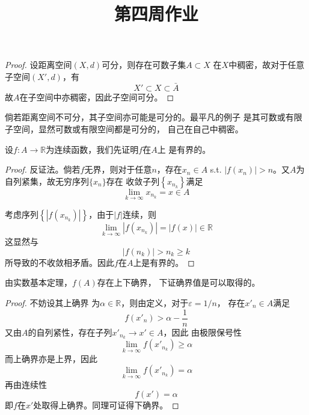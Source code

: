 \documentclass[cn]{homework}
\title{第四周作业}
\begin{document}
    \maketitle

    \problem
    \begin{proof}
        设距离空间$(X,d)$可分，则存在可数子集$A\subset X$
        在$X$中稠密，故对于任意子空间$(X',d)$，有
        \[X'\subset X\subset\bar A\]
        故$A$在子空间中亦稠密，因此子空间可分。
    \end{proof}

    倘若距离空间不可分，其子空间亦可能是可分的。最平凡的例子
    是其可数或有限子空间，显然可数或有限空间都是可分的，
    自己在自己中稠密。

    \problem
    设$f:A\to\mathbb R$为连续函数，我们先证明$f$在$A$上
    是有界的。
    \begin{proof}
        反证法。倘若$f$无界，则对于任意$n$，存在$x_n\in A$ s.t.
        $|f(x_n)|>n$。又$A$为自列紧集，故无穷序列$\{x_n\}$存在
        收敛子列$\left\{x_{n_k}\right\}$满足
        \[\lim_{k\to\infty}x_{n_k}=x\in A\]

        考虑序列$\left\{|f(x_{n_k})|\right\}$，由于$|f|$连续，则
        \[\lim_{k\to\infty}|f(x_{n_k})|=|f(x)|\in\mathbb R\]
        这显然与
        \[|f(n_k)|>n_k\geq k\]
        所导致的不收敛相矛盾。因此$f$在$A$上是有界的。
    \end{proof}

    由实数基本定理，$f(A)$存在上下确界，
    下证确界值是可以取得的。
    \begin{proof}
        不妨设其上确界
        为$\alpha\in\mathbb R$，则由定义，对于$\varepsilon=1/n$，
        存在$x'_n\in A$满足
        \[f(x'_n)>\alpha-\frac{1}{n}\]
        又由$A$的自列紧性，存在子列$x'_{n_k}\to x'\in A$，因此
        由极限保号性
        \[\lim_{k\to\infty}f(x'_{n_k})\geq \alpha\]
        而上确界亦是上界，因此
        \[\lim_{k\to\infty}f(x'_{n_k})=\alpha\]
        再由连续性
        \[f(x')=\alpha\]
        即$f$在$x'$处取得上确界。同理可证得下确界。
    \end{proof}

    \problem
    \problem
\end{document}
